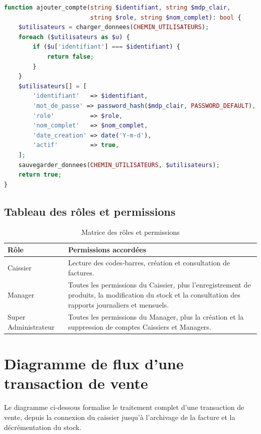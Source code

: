 \documentclass[12pt,a4paper]{article}
\begin{document}
\begin{lstlisting}[language=PHP, caption={Création d'un compte utilisateur}]
function ajouter_compte(string $identifiant, string $mdp_clair,
                        string $role, string $nom_complet): bool {
    $utilisateurs = charger_donnees(CHEMIN_UTILISATEURS);
    foreach ($utilisateurs as $u) {
        if ($u['identifiant'] === $identifiant) {
            return false;
        }
    }
    $utilisateurs[] = [
        'identifiant'   => $identifiant,
        'mot_de_passe' => password_hash($mdp_clair, PASSWORD_DEFAULT),
        'role'          => $role,
        'nom_complet'   => $nom_complet,
        'date_creation' => date('Y-m-d'),
        'actif'         => true,
    ];
    sauvegarder_donnees(CHEMIN_UTILISATEURS, $utilisateurs);
    return true;
}
\end{lstlisting}

\subsection{Tableau des rôles et permissions}

\begin{table}[h!]
\centering
\renewcommand{\arraystretch}{1.3}
\begin{tabular}{|l|p{10cm}|}
\hline
\textbf{Rôle} & \textbf{Permissions accordées} \\
\hline
Caissier & Lecture des codes-barres, création et consultation de factures. \\
\hline
Manager & Toutes les permissions du Caissier, plus l'enregistrement de produits, la modification du stock et la consultation des rapports journaliers et mensuels. \\
\hline
Super Administrateur & Toutes les permissions du Manager, plus la création et la suppression de comptes Caissiers et Managers. \\
\hline
\end{tabular}
\caption{Matrice des rôles et permissions}
\end{table}

\section{Diagramme de flux d'une transaction de vente}
\label{sec:flux}

Le diagramme ci-dessous formalise le traitement complet d'une transaction de vente, depuis la connexion du caissier jusqu'à l'archivage de la facture et la décrémentation du stock.
\end{document}
